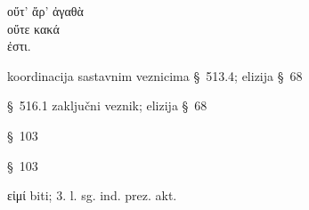 
{\large
\begin{greek}
\noindent οὔτ' ἄρ' ἀγαθὰ \\
οὔτε κακά \\
\tabto{2em} ἐστι.\\

\end{greek}
}

\begin{description}[noitemsep]
\item[οὔτ'\dots\ οὔτε\dots] koordinacija sastavnim veznicima §~513.4; elizija §~68
\item[ἄρ'] §~516.1 zaključni veznik; elizija §~68
\item[ἀγαθὰ] §~103
\item[κακά] §~103
\item[ἐστι] εἰμί biti; 3. l. sg. ind. prez. akt.
\end{description}



